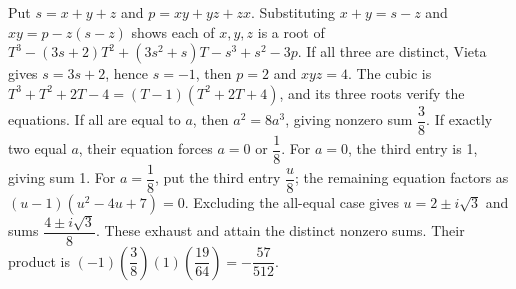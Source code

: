 Put $s=x+y+z$ and $p=xy+yz+zx$. Substituting $x+y=s-z$ and $xy=p-z(s-z)$ shows each of $x,y,z$ is a root of $T^3-(3s+2)T^2+(3s^2+s)T-s^3+s^2-3p$. If all three are distinct, Vieta gives $s=3s+2$, hence $s=-1$, then $p=2$ and $xyz=4$. The cubic is $T^3+T^2+2T-4=(T-1)(T^2+2T+4)$, and its three roots verify the equations. If all are equal to $a$, then $a^2=8a^3$, giving nonzero sum $\dfrac{3}{8}$. If exactly two equal $a$, their equation forces $a=0$ or $\dfrac{1}{8}$. For $a=0$, the third entry is 1, giving sum 1. For $a=\dfrac{1}{8}$, put the third entry $\dfrac{u}{8}$; the remaining equation factors as $(u-1)(u^2-4u+7)=0$. Excluding the all-equal case gives $u=2\pm i\sqrt3$ and sums $\dfrac{4\pm i\sqrt3}{8}$. These exhaust and attain the distinct nonzero sums. Their product is $(-1)(\dfrac{3}{8})(1)(\dfrac{19}{64})=\boxed{-\dfrac{57}{512}}$.
